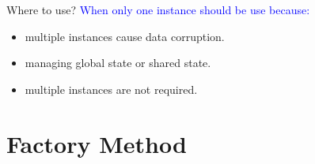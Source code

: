 \documentclass[13pt]{beamer}
\begin{document}
\begin{frame}{Where to use?}
	\textcolor{blue}{When only one instance should be use because:}	
	\begin{itemize}
		\setlength\itemsep{1em}
		\item multiple instances cause data corruption.
		\item managing global state or shared state.
		\item multiple instances are not required.
	\end{itemize}
\end{frame}
\section{Factory Method}
\end{document}
